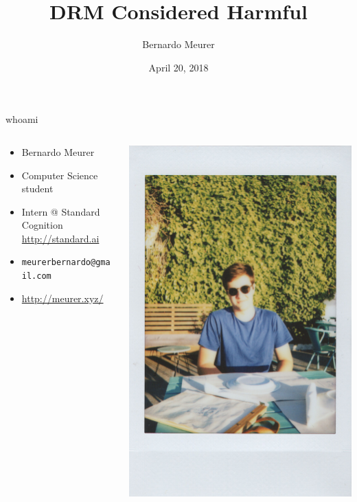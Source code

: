 \documentclass{beamer}
\title{DRM Considered Harmful}
\date{April 20, 2018}
\author{Bernardo Meurer}
\institute{Santa Barbara City College}
\begin{document}
\maketitle

\begin{frame}{whoami}
	\begin{columns}[T]
		\begin{column}{.5\textwidth}
			\begin{block}{}
				\begin{itemize}
					\item Bernardo Meurer
					\item Computer Science student
					\item Intern @ Standard Cognition \url{http://standard.ai}
					\item \texttt{\small{meurerbernardo@gmail.com}}
					\item \url{http://meurer.xyz/}
				\end{itemize}
			\end{block}
		\end{column}

		\begin{column}{.5\textwidth}
			\includegraphics[width=\textwidth]{me.jpg}
		\end{column}
	\end{columns}
\end{frame}
\end{document}
